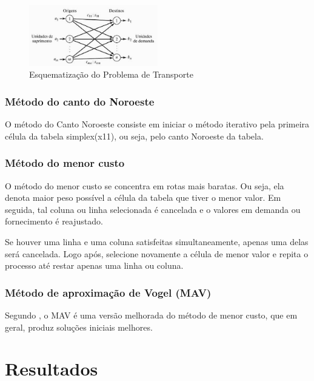 \documentclass [11pt]{articleSBPO}
\begin{document}
\begin{figure}[!h]
\centering
\includegraphics[width=0.5\textwidth]{img/img2.png}
\caption[]{Esquematização do Problema de Transporte}
\label{fig:figura2}
\end{figure}

\subsubsection{Método do canto do Noroeste}

O método do Canto Noroeste consiste em iniciar o método iterativo pela primeira célula da tabela simplex(x11), ou seja, pelo canto Noroeste da tabela.

\subsubsection{Método do menor custo}

O método do menor custo se concentra em rotas mais baratas. Ou seja, ela denota maior peso possível a célula da tabela que tiver o menor valor. Em seguida, tal coluna ou linha selecionada é cancelada e o valores em demanda ou fornecimento é reajustado.

Se houver uma linha e uma coluna satisfeitas simultaneamente, apenas uma delas será cancelada. Logo após, selecione novamente a célula de menor valor e repita o processo até restar apenas uma linha ou coluna.

\subsubsection{Método de aproximação de Vogel (MAV)}

Segundo \cite{TAHA}, o MAV é uma versão melhorada do método de menor custo, que em geral, produz soluções iniciais melhores.

\section{Resultados}
\label{sec:resultados}



\end{document}
